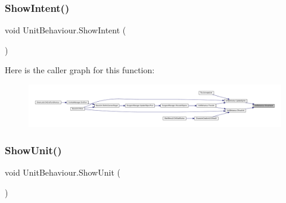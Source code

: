 \mbox{\label{class_unit_behaviour_a0cf70610b8aef46ef592819496ac7950}} 
\subsubsection{\texorpdfstring{ShowIntent()}{ShowIntent()}}
{\footnotesize\ttfamily void Unit\+Behaviour.\+Show\+Intent (\begin{DoxyParamCaption}{ }\end{DoxyParamCaption})}

Here is the caller graph for this function\+:
\nopagebreak
\begin{figure}[H]
\begin{center}
\leavevmode
\includegraphics[width=350pt]{class_unit_behaviour_a0cf70610b8aef46ef592819496ac7950_icgraph}
\end{center}
\end{figure}
\mbox{\label{class_unit_behaviour_a41b8d7f5a98e21449eafe21a31707b1d}} 
\subsubsection{\texorpdfstring{ShowUnit()}{ShowUnit()}}
{\footnotesize\ttfamily void Unit\+Behaviour.\+Show\+Unit (\begin{DoxyParamCaption}{ }\end{DoxyParamCaption})}

